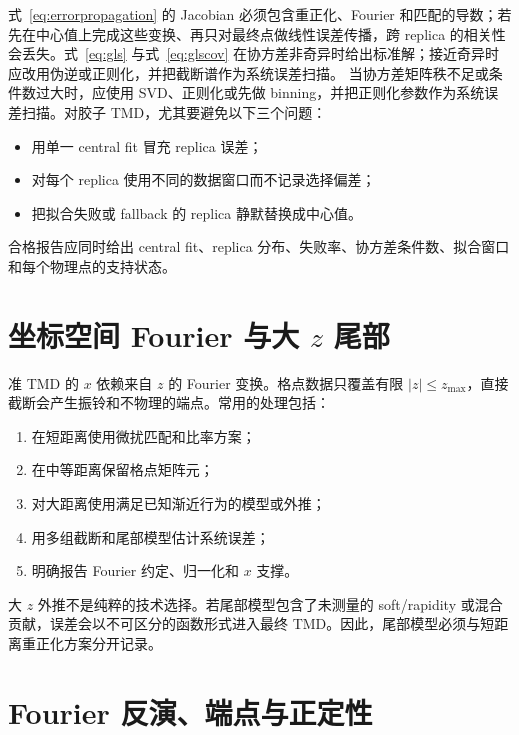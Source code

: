 \documentclass[UTF8,12pt,a4paper,twoside,openany]{ctexbook}
\begin{document}
式~\eqref{eq:errorpropagation} 的 Jacobian 必须包含重正化、Fourier 和匹配的导数；若先在中心值上完成这些变换、再只对最终点做线性误差传播，跨 replica 的相关性会丢失。式~\eqref{eq:gls} 与式~\eqref{eq:glscov} 在协方差非奇异时给出标准解；接近奇异时应改用伪逆或正则化，并把截断谱作为系统误差扫描。
当协方差矩阵秩不足或条件数过大时，应使用 SVD、正则化或先做 binning，并把正则化参数作为系统误差扫描。对胶子 TMD，尤其要避免以下三个问题：
\begin{itemize}
  \item 用单一 central fit 冒充 replica 误差；
  \item 对每个 replica 使用不同的数据窗口而不记录选择偏差；
  \item 把拟合失败或 fallback 的 replica 静默替换成中心值。
\end{itemize}
合格报告应同时给出 central fit、replica 分布、失败率、协方差条件数、拟合窗口和每个物理点的支持状态。

\section{坐标空间 Fourier 与大 \texorpdfstring{\(z\)}{z} 尾部}

准 TMD 的 \(x\) 依赖来自 \(z\) 的 Fourier 变换。格点数据只覆盖有限 \(|z|\le z_{\max}\)，直接截断会产生振铃和不物理的端点。常用的处理包括：
\begin{enumerate}
  \item 在短距离使用微扰匹配和比率方案；
  \item 在中等距离保留格点矩阵元；
  \item 对大距离使用满足已知渐近行为的模型或外推；
  \item 用多组截断和尾部模型估计系统误差；
  \item 明确报告 Fourier 约定、归一化和 \(x\) 支撑。
\end{enumerate}
大 \(z\) 外推不是纯粹的技术选择。若尾部模型包含了未测量的 soft/rapidity 或混合贡献，误差会以不可区分的函数形式进入最终 TMD。因此，尾部模型必须与短距离重正化方案分开记录。

\section{Fourier 反演、端点与正定性}
\end{document}
